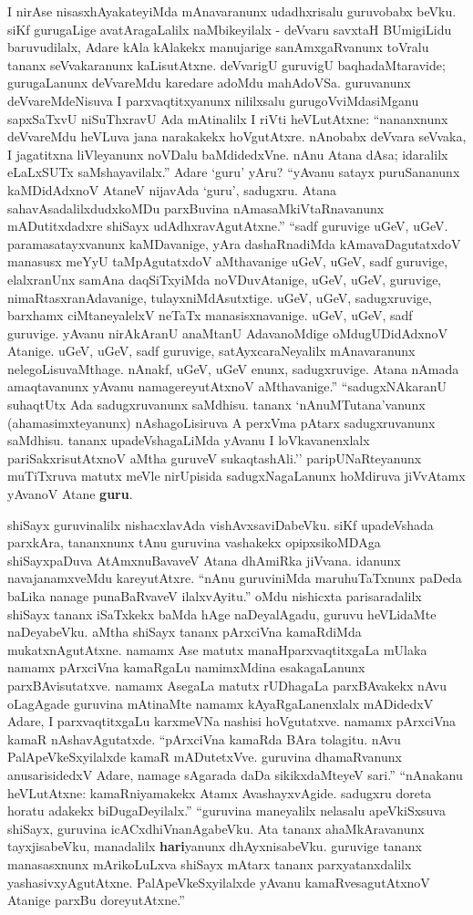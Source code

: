 I nirAse nisasxhAyakateyiMda mAnavaranunx udadhxrisalu guruvobabx beVku. siKf gurugaLige avatAragaLalilx naMbikeyilalx - deVvaru savxtaH BUmigiLidu baruvudilalx, Adare kAla kAlakekx manujarige sanAmxgaRvanunx toVralu tananx seVvakaranunx kaLisutAtxne. deVvarigU guruvigU baqhadaMtaravide; gurugaLanunx deVvareMdu karedare adoMdu mahAdoVSa. guruvanunx deVvareMdeNisuva I parxvaqtitxyanunx nililxsalu gurugoVviMdasiMganu sapxSaTxvU niSuThxravU Ada mAtinalilx I riVti heVLutAtxne: ``nananxnunx deVvareMdu heVLuva jana narakakekx hoVgutAtxre. nAnobabx deVvara seVvaka, I jagatitxna liVleyanunx noVDalu baMdidedxVne. nAnu Atana dAsa; idaralilx eLaLxSUTx saMshayavilalx.'' Adare `guru' yAru? ``yAvanu satayx puruSananunx kaMDidAdxnoV AtaneV nijavAda `guru', sadugxru. Atana sahavAsadalilxdudxkoMDu parxBuvina nAmasaMkiVtaRnavanunx mADutitxdadxre shiSayx udAdhxravAgutAtxne.'' ``sadf guruvige uGeV, uGeV. paramasatayxvanunx kaMDavanige, yAra dashaRnadiMda kAmavaDagutatxdoV manasusx meYyU taMpAgutatxdoV aMthavanige uGeV, uGeV, sadf guruvige, elalxranUnx samAna daqSiTxyiMda noVDuvAtanige, uGeV, uGeV, guruvige, nimaRtasxranAdavanige, tulayxniMdAsutxtige. uGeV, uGeV, sadugxruvige, barxhamx ciMtaneyalelxV neTaTx manasisxnavanige. uGeV, uGeV, sadf guruvige. yAvanu nirAkAranU anaMtanU AdavanoMdige oMdugUDidAdxnoV Atanige. uGeV, uGeV, sadf guruvige, satAyxcaraNeyalilx mAnavaranunx nelegoLisuvaMthage. nAnakf, uGeV, uGeV enunx, sadugxruvige. Atana nAmada amaqtavanunx yAvanu namagereyutAtxnoV aMthavanige.'' ``sadugxNAkaranU suhaqtUtx Ada sadugxruvanunx saMdhisu. tananx `nAnuMTutana'vanunx (ahamasimxteyanunx) nAshagoLisiruva A perxVma pAtarx sadugxruvanunx saMdhisu. tananx upadeVshagaLiMda yAvanu I loVkavanenxlalx pariSakxrisutAtxnoV aMtha guruveV sukaqtashAli.'' paripUNaRteyanunx muTiTxruva matutx meVle nirUpisida sadugxNagaLanunx hoMdiruva jiVvAtamx yAvanoV Atane {\bf guru}.

shiSayx guruvinalilx nishacxlavAda vishAvxsaviDabeVku. siKf upadeVshada parxkAra, tananxnunx tAnu guruvina vashakekx opipxsikoMDAga shiSayxpaDuva AtAmxnuBavaveV Atana dhAmiRka jiVvana. idanunx navajanamxveMdu kareyutAtxre. ``nAnu guruviniMda maruhuTaTxnunx paDeda baLika nanage punaBaRvaveV ilalxvAyitu.'' oMdu nishicxta parisaradalilx shiSayx tananx iSaTxkekx baMda hAge naDeyalAgadu, guruvu heVLidaMte naDeyabeVku. aMtha shiSayx tananx pArxciVna kamaRdiMda mukatxnAgutAtxne. namamx Ase matutx manaHparxvaqtitxgaLa mUlaka namamx pArxciVna kamaRgaLu namimxMdina esakagaLanunx parxBAvisutatxve. namamx AsegaLa matutx rUDhagaLa parxBAvakekx nAvu oLagAgade guruvina mAtinaMte namamx kAyaRgaLanenxlalx mADidedxV Adare, I parxvaqtitxgaLu karxmeVNa nashisi hoVgutatxve. namamx pArxciVna kamaR nAshavAgutatxde. ``pArxciVna kamaRda BAra tolagitu. nAvu PalApeVkeSxyilalxde kamaR mADutetxVve. guruvina dhamaRvanunx anusarisidedxV Adare, namage sAgarada daDa sikikxdaMteyeV sari.'' ``nAnakanu heVLutAtxne: kamaRniyamakekx Atamx AvashayxvAgide. sadugxru doreta horatu adakekx biDugaDeyilalx.'' ``guruvina maneyalilx nelasalu apeVkiSxsuva shiSayx, guruvina icACxdhiVnanAgabeVku. Ata tananx ahaMkAravanunx tayxjisabeVku, manadalilx {\bf hari}yanunx dhAyxnisabeVku. guruvige tananx manasasxnunx mArikoLuLxva shiSayx mAtarx tananx parxyatanxdalilx yashasivxyAgutAtxne. PalApeVkeSxyilalxde yAvanu kamaRvesagutAtxnoV Atanige parxBu doreyutAtxne.''

